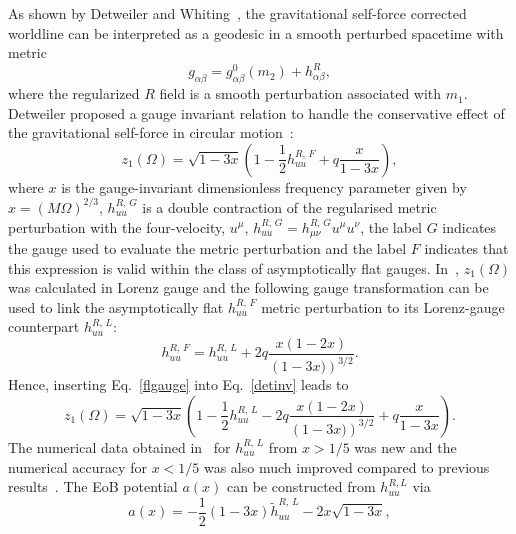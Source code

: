 \documentclass[aps,prd,showpacs,amssymb,floatfix,nofootinbib,superscriptaddress]{revtex4-1}%
\begin{document}
As shown by Detweiler and Whiting~\cite{Detweiler:2003}, the gravitational self-force corrected worldline can be interpreted as a  geodesic in a smooth perturbed spacetime with metric
 \begin{equation}
 g_{\alpha \beta} =  g^{0}_{\alpha \beta}(m_2) + h^{R}_{\alpha \beta},
 \label{detint}
 \end{equation}
 \noindent where the regularized \(R\) field is a smooth perturbation associated with \(m_1\). Detweiler proposed a gauge invariant relation to handle the conservative effect of the gravitational self-force in circular motion~\cite{Detweiler:2008,Detweiler:2009}:
 \begin{equation}
z_1(\Omega)= \sqrt{1-3x}\left(1- \frac{1}{2} h^{R,\,F}_{uu} + q \frac{x}{1-3x}\right),
\label{detinv}
\end{equation}
\noindent where  \(x\) is the gauge-invariant dimensionless frequency parameter given by \(x=\left(M \Omega\right)^{2/3}\), \(h^{R,\,G}_{uu}\) is a double contraction of the regularised metric perturbation with the four-velocity, \(u^{\mu}\), \( h^{R,\, G}_{uu} = h^{R,\,G}_{\mu\nu}u^{\mu} u^{\nu} \), the label \(G\) indicates the gauge used to evaluate the metric perturbation and the label \(F\) indicates that this expression is valid within the class of asymptotically flat gauges. In~\cite{Akcay:2012}, \(z_1(\Omega)\) was calculated in Lorenz gauge and the following gauge transformation can be used to link the asymptotically flat \(h^{R,\,F}_{uu} \) metric perturbation to its Lorenz-gauge counterpart \(h^{R,\,L}_{uu} \):
\begin{equation}
h^{R,\,F}_{uu} = h^{R,\,L}_{uu} + 2q\frac{x(1-2x)}{\left(1-3x)\right)^{3/2}}.
\label{flgauge}
\end{equation}
\noindent  Hence, inserting Eq.~\eqref{flgauge} into Eq.~\eqref{detinv} leads to
 \begin{equation}
z_1(\Omega)= \sqrt{1-3x}\left(1- \frac{1}{2} h^{R,\,L}_{uu}  - 2q\frac{x(1-2x)}{\left(1-3x)\right)^{3/2}} + q \frac{x}{1-3x}\right).
\label{detinvLOR}
\end{equation}
\noindent The numerical data obtained in~\cite{Akcay:2012} for \(h^{R,\,L}_{uu} \) from \(x>1/5\) was new and the numerical accuracy for \(x<1/5\) was also much improved compared to previous results~\cite{Detweiler:2008,baracknewphi}. The EoB potential \(a(x)\) can be constructed from $h_{uu}^{R,L}$ via
\begin{equation}
 a(x) = -\frac{1}{2}\left(1-3x\right)\tilde{h}^{R,\,L}_{uu} - 2x \sqrt{1-3x},
 \label{formal_a}
 \end{equation}
\end{document}
